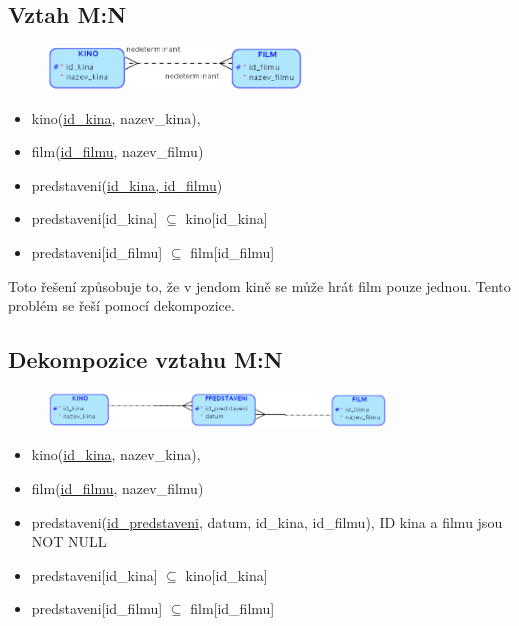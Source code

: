 \documentclass{szzclass}
\begin{document}
\subsection{Vztah M:N}
\begin{figure}[h!]
    \centering
    \includegraphics[width=0.6\textwidth]{topics/bi-wsi-si-02/images/MToN.png}
\end{figure}
\begin{itemize}
    \item kino(\underline{id\_kina}, nazev\_kina),
    \item film(\underline{id\_filmu}, nazev\_filmu)
    \item predstaveni(\underline{id\_kina, id\_filmu})
    \item predstaveni[id\_kina] $\subseteq$ kino[id\_kina]
    \item predstaveni[id\_filmu] $\subseteq$ film[id\_filmu]
\end{itemize}
Toto řešení způsobuje to, že v jendom kině se může hrát film pouze jednou. Tento problém se řeší pomocí dekompozice.

\subsection{Dekompozice vztahu M:N}
\begin{figure}[h!]
    \centering
    \includegraphics[width=0.8\textwidth]{topics/bi-wsi-si-02/images/decoMToN.png}
\end{figure}
\begin{itemize}
    \item kino(\underline{id\_kina}, nazev\_kina),
    \item film(\underline{id\_filmu}, nazev\_filmu)
    \item predstaveni(\underline{id\_predstaveni}, datum, id\_kina, id\_filmu), ID kina a filmu jsou NOT NULL
    \item predstaveni[id\_kina] $\subseteq$ kino[id\_kina] 
    \item predstaveni[id\_filmu] $\subseteq$ film[id\_filmu]
\end{itemize}
\end{document}
